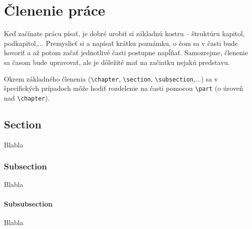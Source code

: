 \chapter{Členenie práce}

Keď začínate prácu písať, je dobré urobiť si základnú kostru -- štruktúru kapitol, podkapitol,... Premyslieť si a napísať krátku poznámku, o čom sa v časti bude hovoriť a až potom začať jednotlivé časti postupne napĺňať. Samozrejme, členenie sa časom bude upravovať, ale je dôležité mať na začiatku nejakú predstavu.

Okrem základného členenia (\texttt{\textbackslash chapter}, \texttt{\textbackslash section}, \texttt{\textbackslash subsection},...) sa v špecifických prípadoch môže hodiť rozdelenie na časti pomocou \texttt{\textbackslash part} (o úroveň nad \texttt{\textbackslash chapter}).


\section{Section}\label{}
Blabla

\subsection{Subsection}
Blabla

\subsubsection{Subsubsection}
Blabla

%
